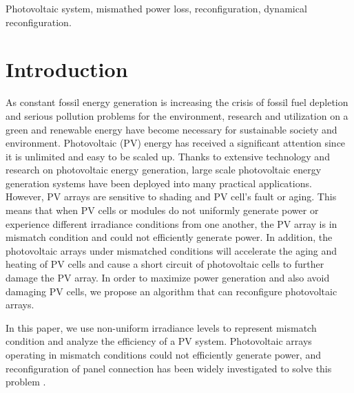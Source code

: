 \documentclass[conference]{IEEEtran}
\begin{document}
\begin{IEEEkeywords}
  Photovoltaic system, mismathed power loss, reconfiguration, dynamical reconfiguration.
\end{IEEEkeywords}

\section{Introduction} \label{intro}
As constant fossil energy generation is increasing the crisis of fossil fuel depletion and serious pollution problems for the environment, 
research and utilization on a green and renewable energy have become necessary for sustainable society and environment.
Photovoltaic (PV) energy has received a significant attention since it is unlimited and easy to be scaled up. Thanks to extensive technology and research on photovoltaic energy generation, large scale photovoltaic energy generation systems have been deployed into many practical applications. However, PV arrays are sensitive to shading and PV cell's fault or aging. This means that when 
PV cells or modules do not uniformly generate power
 or experience different irradiance conditions from one another, the PV array is in mismatch condition and could not efficiently generate power. In addition, the photovoltaic arrays under mismatched conditions will accelerate the aging and heating of PV cells and cause a short circuit of photovoltaic cells to further damage the PV array. In order to maximize power generation and also avoid damaging PV cells, we propose an algorithm that can reconfigure photovoltaic arrays.
 
In this paper, we use non-uniform irradiance levels to represent mismatch condition and analyze the efficiency of a PV system.
Photovoltaic arrays operating in mismatch conditions could not efficiently generate power, and reconfiguration of  panel connection has been widely investigated to solve this problem \cite{b2}.
\end{document}

